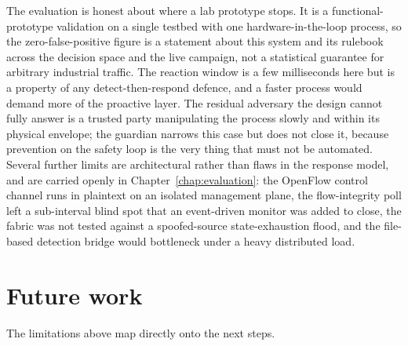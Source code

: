 The evaluation is honest about where a lab prototype stops. It is a functional-prototype validation on a single testbed with one hardware-in-the-loop process, so the zero-false-positive figure is a statement about this system and its rulebook across the decision space and the live campaign, not a statistical guarantee for arbitrary industrial traffic. The reaction window is a few milliseconds here but is a property of any detect-then-respond defence, and a faster process would demand more of the proactive layer. The residual adversary the design cannot fully answer is a trusted party manipulating the process slowly and within its physical envelope; the guardian narrows this case but does not close it, because prevention on the safety loop is the very thing that must not be automated. Several further limits are architectural rather than flaws in the response model, and are carried openly in Chapter~\ref{chap:evaluation}: the OpenFlow control channel runs in plaintext on an isolated management plane, the flow-integrity poll left a sub-interval blind spot that an event-driven monitor was added to close, the fabric was not tested against a spoofed-source state-exhaustion flood, and the file-based detection bridge would bottleneck under a heavy distributed load.

\section{Future work}
\label{sec:futurework}

The limitations above map directly onto the next steps.

